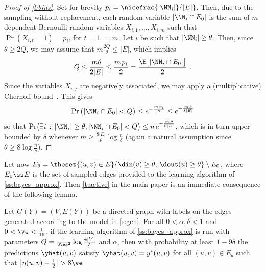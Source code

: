 \begin{proof}[Proof of \autoref{l:bins}]
  Set for brevity $p_i = \nicefrac{|\NN_i|}{|E|}$. Then, due to the sampling without replacement,
  each random
variable $|\NN_i \cap E_0|$ is the sum of $m$ dependent Bernoulli random variables $X_{i,1}, \ldots,
X_{i,m}$ such that $\Pr(X_{i,t} = 1) = p_i$, for $t = 1, \ldots, m$. Let $i$ be such that $|\NN_i|
\geq \theta$. Then, since $\theta \geq 2Q$, we may assume that $m\frac{2Q}{\theta} \leq |E|$, which implies
\[
Q \leq \frac{m\theta}{2|E|} \leq \frac{m\,p_i}{2} = \frac{\E\big[|\NN_i \cap E_0|\big]}{2}~.
\]
Since the variables $X_{i,j}$ are negatively associated, we may apply a (multiplicative) Chernoff
bound~\autocite[Section~3.1]{dpbook}.
This gives
\[
\Pr\big(|\NN_i \cap E_0| < Q\big) \leq e^{-\frac{m\,p_i}{8}} \leq e^{-\frac{m\,\theta}{8|E|}}
\]
so that
$
\Pr\bigl( \exists i\,:\, |\NN_i| \geq \theta, |\NN_i \cap E_0| < Q\bigr) \leq n\,e^{-\frac{m\,\theta}{8|E|}}
$,
which is in turn upper bounded by $\delta$ whenever 
$m \geq \frac{8|E|}{\theta}\log \frac{n}{\delta}$ (again a natural assumption since $\theta \geq
8\log\frac{n}{\delta}$). %
\end{proof}

Let now $E_{\theta} = \theset{(u,v) \in E}{\din(v) \ge \theta,\, \dout(u) \ge \theta} \setminus
E_0$, where $E_0 \ss E$ is the set of sampled edges provided to the learning algorithm of
\autoref{ss:bayes_approx}. Then \autoref{t:active} in the main paper is an immediate consequence of the
following lemma. 

\begin{lemma}\label{l:active}
Let $G(Y) = (V,E(Y))$ be a directed graph with labels on the edges generated according to the model
in \autoref{s:gen}.
For all $0 < \alpha,\delta < 1$ and $0 < \ve < \tfrac{1}{16}$, if the learning algorithm of
\autoref{ss:bayes_approx} is run with parameters $Q = \tfrac{1}{2\ve^2}\log\frac{4|V|}{\delta}$ and
$\alpha$, then with probability at least $1-9\delta$ the predictions $\yhat(u,v)$ satisfy
$\yhat(u,v) = y^*(u,v)$ for all $(u,v) \in E_{\theta}$ such that $\big|\eta(u,v) - \tfrac{1}{2}\big|
> 8\ve$.
\end{lemma}

